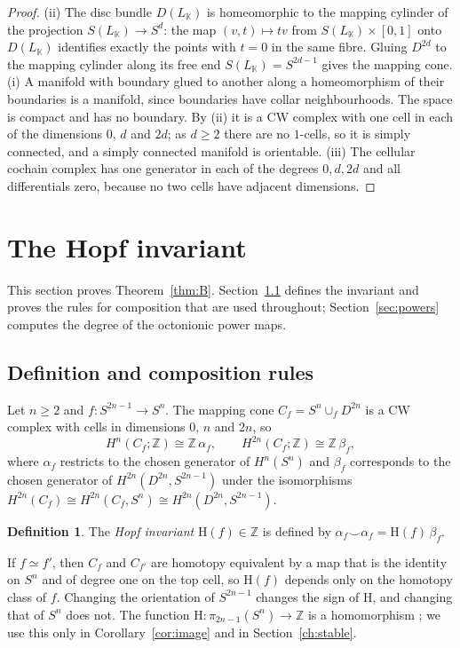 \documentclass[11pt]{amsart}
\numberwithin{equation}{section}
\theoremstyle{plain}
\theoremstyle{definition}
\newtheorem{definition}[theorem]{Definition}
\theoremstyle{remark}
\newcommand{\K}{\mathbb{K}}
\newcommand{\Z}{\mathbb{Z}}
\newcommand{\Hopf}{\mathrm{H}}
\begin{document}
\begin{proof}
(ii) The disc bundle $D(L_\K)$ is homeomorphic to the mapping cylinder of the projection $S(L_\K)\to S^d$: the map $(v,t)\mapsto tv$ from $S(L_\K)\times[0,1]$ onto $D(L_\K)$ identifies exactly the points with $t=0$ in the same fibre. Gluing $D^{2d}$ to the mapping cylinder along its free end $S(L_\K)=S^{2d-1}$ gives the mapping cone.
(i) A manifold with boundary glued to another along a homeomorphism of their boundaries is a manifold, since boundaries have collar neighbourhoods. The space is compact and has no boundary. By (ii) it is a CW complex with one cell in each of the dimensions $0$, $d$ and $2d$; as $d\ge2$ there are no $1$-cells, so it is simply connected, and a simply connected manifold is orientable.
(iii) The cellular cochain complex has one generator in each of the degrees $0,d,2d$ and all differentials zero, because no two cells have adjacent dimensions.
\end{proof}
\section{The Hopf invariant}\label{ch:invariant}

This section proves Theorem~\ref{thm:B}. Section~\ref{sec:hdef} defines the invariant and proves the rules for composition that are used throughout; Section~\ref{sec:powers} computes the degree of the octonionic power maps.

\subsection{Definition and composition rules}\label{sec:hdef}

Let $n\ge2$ and $f\colon S^{2n-1}\to S^n$. The mapping cone $C_f=S^n\cup_fD^{2n}$ is a CW complex with cells in dimensions $0$, $n$ and $2n$, so
\[
H^n(C_f;\Z)\cong\Z\,\alpha_f,\qquad H^{2n}(C_f;\Z)\cong\Z\,\beta_f,
\]
where $\alpha_f$ restricts to the chosen generator of $H^n(S^n)$ and $\beta_f$ corresponds to the chosen generator of $H^{2n}(D^{2n},S^{2n-1})$ under the isomorphisms $H^{2n}(C_f)\cong H^{2n}(C_f,S^n)\cong H^{2n}(D^{2n},S^{2n-1})$.

\begin{definition}\label{def:hopfinv}
The \emph{Hopf invariant} $\Hopf(f)\in\Z$ is defined by $\alpha_f\smile\alpha_f=\Hopf(f)\,\beta_f$.
\end{definition}

If $f\simeq f'$, then $C_f$ and $C_{f'}$ are homotopy equivalent by a map that is the identity on $S^n$ and of degree one on the top cell, so $\Hopf(f)$ depends only on the homotopy class of $f$. Changing the orientation of $S^{2n-1}$ changes the sign of $\Hopf$, and changing that of $S^n$ does not. The function $\Hopf\colon\pi_{2n-1}(S^n)\to\Z$ is a homomorphism \cite[Proposition~4B.1]{Hat02}; we use this only in Corollary~\ref{cor:image} and in Section~\ref{ch:stable}.
\end{document}
